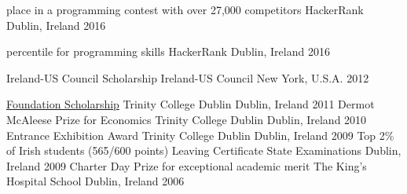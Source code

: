   
    \begin{cvhonors}
       
       \cvhonor
        { place in a programming contest with over 27,000 competitors}
        {HackerRank}
        {Dublin, Ireland}
        {2016}
       
       \cvhonor
        { percentile for programming skills}
        {HackerRank}
        {Dublin, Ireland}
        {2016}
       
       
       \cvhonor
        {Ireland-US Council Scholarship}
        {Ireland-US Council}
        {New York, U.S.A.}
        {2012}
      
      \cvhonor
        {\href{https://en.wikipedia.org/wiki/Trinity_College,_Dublin\#Scholarship}{\textcolor{awesome-skyblue}{Foundation Scholarship}}}
        {Trinity College Dublin}
        {Dublin, Ireland}
        {2011}
      \cvhonor
        {Dermot McAleese Prize for Economics}
        {Trinity College Dublin}
        {Dublin, Ireland}
        {2010}
      \cvhonor
        {Entrance Exhibition Award}
        {Trinity College Dublin}
        {Dublin, Ireland}
        {2009}
    \cvhonor
        {Top 2\% of Irish students (565/600 points)}
        {Leaving Certificate State Examinations}
        {Dublin, Ireland}
        {2009}
      \cvhonor
        {Charter Day Prize for exceptional academic merit}
        {The King's Hospital School}
        {Dublin, Ireland}
        {2006}
    \end{cvhonors}

  


 
   